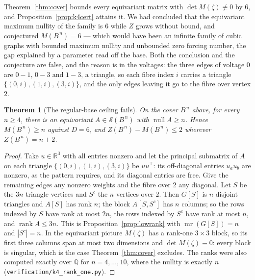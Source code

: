 \documentclass[11pt]{article}
\newtheorem{theorem}{Theorem}
\theoremstyle{definition}
\begin{document}
\noindent
Theorem~\ref{thm:cover} bounds every equivariant matrix with
$\det M(\zeta)\not\equiv0$ by $6$, and Proposition~\ref{prop:k4cert} attains it.
We had concluded that the equivariant maximum nullity of the family is $6$
while $Z$ grows without bound, and conjectured $M(B^{\,n})=6$ --- which would
have been an infinite family of cubic graphs with bounded maximum nullity and
unbounded zero forcing number, the gap explained by a parameter read off the
base. Both the conclusion and the conjecture are false, and the reason is in
the voltages: the three edges of voltage $0$ are $0\!-\!1$, $0\!-\!3$ and
$1\!-\!3$, a triangle, so each fibre index $i$ carries a triangle
$\{(0,i),(1,i),(3,i)\}$, and the only edges leaving it go to the fibre over
vertex $2$.

\begin{theorem}[The regular-base ceiling fails]\label{thm:k4rankone}
On the cover $B^{\,n}$ above, for every $n\ge4$, there is an equivariant
$A\in\mathcal S(B^{\,n})$ with $\operatorname{null}A\ge n$. Hence
$M(B^{\,n})\ge n$ against $D=6$, and $Z(B^{\,n})-M(B^{\,n})\le2$ wherever
$Z(B^{\,n})=n+2$.
\end{theorem}

\begin{proof}
Take $u\in\mathbb R^{3}$ with all entries nonzero and let the principal
submatrix of $A$ on each triangle $\{(0,i),(1,i),(3,i)\}$ be $uu^{\!\top}$: its
off-diagonal entries $u_au_b$ are nonzero, as the pattern requires, and its
diagonal entries are free. Give the remaining edges any nonzero weights and the
fibre over $2$ any diagonal. Let $S$ be the $3n$ triangle vertices and $S^c$
the $n$ vertices over $2$. Then $G[S]$ is $n$ disjoint triangles and $A[S]$ has
rank $n$; the block $A[S,S^c]$ has $n$ columns; so the rows indexed by $S$ have
rank at most $2n$, the rows indexed by $S^c$ have rank at most $n$, and
$\operatorname{rank}A\le3n$. This is Proposition~\ref{prop:lowrank} with
$\operatorname{mr}(G[S])=n$ and $|S^c|=n$. In the equivariant picture
$M(\zeta)$ has a rank-one $3\times3$ block, so its first three columns span at
most two dimensions and $\det M(\zeta)\equiv0$: every block is singular, which
is the case Theorem~\ref{thm:cover} excludes. The ranks were also computed
exactly over $\mathbb Q$ for $n=4,\dots,10$, where the nullity is exactly $n$
(\texttt{verification/k4\_rank\_one.py}).
\end{proof}
\end{document}
